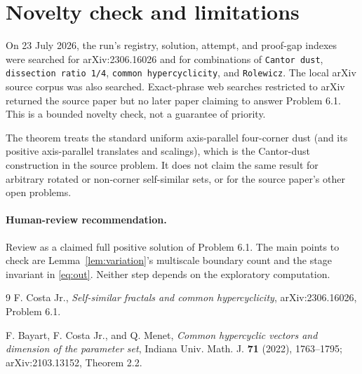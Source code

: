 \documentclass[11pt]{article}
\begin{document}
\section*{Novelty check and limitations}

On 23 July 2026, the run's registry, solution, attempt, and proof-gap indexes
were searched for arXiv:2306.16026 and for combinations of
\texttt{Cantor dust}, \texttt{dissection ratio 1/4},
\texttt{common hypercyclicity}, and \texttt{Rolewicz}.  The local arXiv
source corpus was also searched.  Exact-phrase web searches restricted to
arXiv returned the source paper but no later paper claiming to answer Problem
6.1.  This is a bounded novelty check, not a guarantee of priority.

The theorem treats the standard uniform axis-parallel four-corner dust (and
its positive axis-parallel translates and scalings), which is the Cantor-dust
construction in the source problem.  It does not claim the same result for
arbitrary rotated or non-corner self-similar sets, or for the source paper's
other open problems.

\paragraph{Human-review recommendation.}
Review as a claimed full positive solution of Problem 6.1.  The main points to
check are Lemma~\ref{lem:variation}'s multiscale boundary count and the
stage invariant in \eqref{eq:out}.  Neither step depends on the exploratory
computation.

{\small
\begin{thebibliography}{9}
F. Costa Jr.,
\emph{Self-similar fractals and common hypercyclicity},
arXiv:2306.16026, Problem 6.1.

F. Bayart, F. Costa Jr., and Q. Menet,
\emph{Common hypercyclic vectors and dimension of the parameter set},
Indiana Univ. Math. J. \textbf{71} (2022), 1763--1795;
arXiv:2103.13152, Theorem 2.2.
\end{thebibliography}
}
\end{document}
